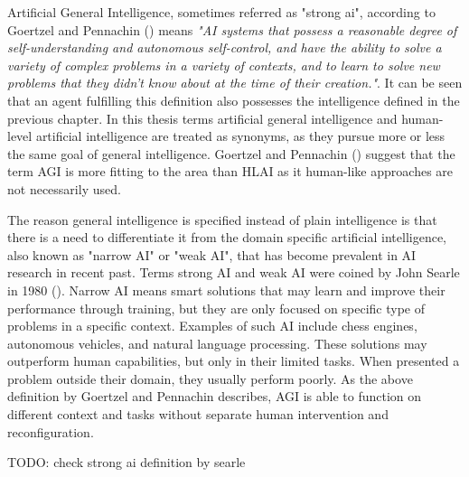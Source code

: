 \documentclass[utf8,english]{gradu3}
\begin{document}


Artificial General Intelligence, sometimes referred as "strong ai", according to
Goertzel and Pennachin (\cite*{goertzel2007}) means \emph{"AI systems that
possess a reasonable degree of self-understanding and autonomous self-control,
and have the ability to solve a variety of complex problems in a variety of
contexts, and to learn to solve new problems that they didn't know about at the
time of their creation."}. It can be seen that an agent fulfilling this
definition also possesses the intelligence defined in the previous chapter. In
this thesis terms artificial general intelligence and human-level artificial
intelligence are treated as synonyms, as they pursue more or less the same goal
of general intelligence. Goertzel and Pennachin (\cite*{goertzel2007}) suggest
that the term AGI is more fitting to the area than HLAI as it human-like
approaches are not necessarily used. 

The reason general intelligence is specified instead of plain intelligence is
that there is a need to differentiate it from the domain specific artificial
intelligence, also known as "narrow AI" or "weak AI", that has become prevalent
in AI research in recent past. Terms strong AI and weak AI were coined by John
Searle in 1980 (\cite{searle1980}). Narrow AI means smart solutions that may
learn and improve their performance through training, but they are only focused
on specific type of problems in a specific context. Examples of such AI include
chess engines, autonomous vehicles, and natural language processing. These
solutions may outperform human capabilities, but only in their limited tasks.
When presented a problem outside their domain, they usually perform poorly. As
the above definition by Goertzel and Pennachin describes, AGI is able to
function on different context and tasks without separate human intervention and
reconfiguration.

TODO: check strong ai definition by searle
\end{document}
